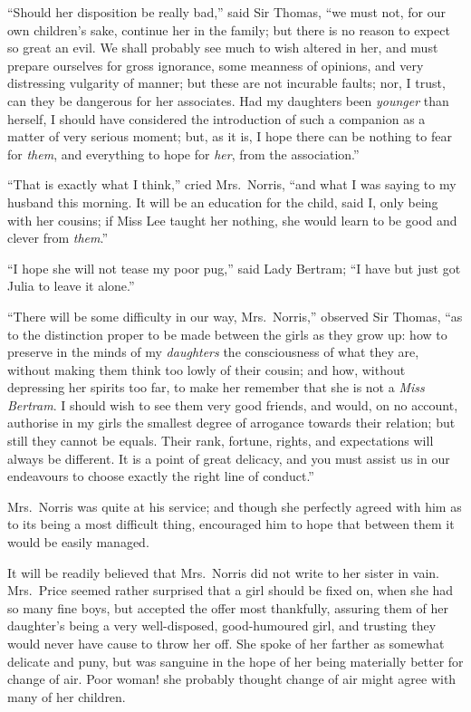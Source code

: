 \documentclass{article}
\begin{document}
``Should her disposition be really bad,'' said Sir Thomas,
``we must not, for our own children's sake, continue her
in the family; but there is no reason to expect so great
an evil.  We shall probably see much to wish altered
in her, and must prepare ourselves for gross ignorance,
some meanness of opinions, and very distressing vulgarity
of manner; but these are not incurable faults; nor, I trust,
can they be dangerous for her associates.  Had my daughters
been \emph{younger} than herself, I should have considered
the introduction of such a companion as a matter of very
serious moment; but, as it is, I hope there can be nothing
to fear for \emph{them}, and everything to hope for \emph{her},
from the association.''

``That is exactly what I think,'' cried Mrs.\ Norris,
``and what I was saying to my husband this morning.
It will be an education for the child, said I, only being
with her cousins; if Miss Lee taught her nothing, she would
learn to be good and clever from \emph{them}.''

``I hope she will not tease my poor pug,'' said Lady Bertram;
``I have but just got Julia to leave it alone.''

``There will be some difficulty in our way, Mrs.\ Norris,''
observed Sir Thomas, ``as to the distinction proper to be made
between the girls as they grow up:  how to preserve in the
minds of my \emph{daughters} the consciousness of what they are,
without making them think too lowly of their cousin;
and how, without depressing her spirits too far,
to make her remember that she is not a \emph{Miss Bertram}.
I should wish to see them very good friends, and would,
on no account, authorise in my girls the smallest degree
of arrogance towards their relation; but still they cannot
be equals.  Their rank, fortune, rights, and expectations
will always be different.  It is a point of great delicacy,
and you must assist us in our endeavours to choose exactly
the right line of conduct.''

Mrs.\ Norris was quite at his service; and though she
perfectly agreed with him as to its being a most
difficult thing, encouraged him to hope that between
them it would be easily managed.

It will be readily believed that Mrs.\ Norris did not write
to her sister in vain.  Mrs.\ Price seemed rather surprised
that a girl should be fixed on, when she had so many fine boys,
but accepted the offer most thankfully, assuring them of her
daughter's being a very well-disposed, good-humoured girl,
and trusting they would never have cause to throw her off.
She spoke of her farther as somewhat delicate and puny,
but was sanguine in the hope of her being materially better
for change of air.  Poor woman! she probably thought
change of air might agree with many of her children.
\end{document}
